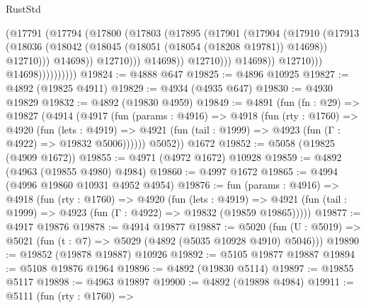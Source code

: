 \begin{lexlean}{RustStd}
\begin{coremodule}
                                      (@17791
                                        (@17794
                                          (@17800
                                            (@17803
                                              (@17895
                                                (@17901
                                                  (@17904
                                                    (@17910
                                                      (@17913
                                                        (@18036
                                                          (@18042
                                                            (@18045
                                                              (@18051
                                                                (@18054 (@18208 @19781))
                                                                @14698))
                                                            @12710)))
                                                      @14698))
                                                  @12710)))
                                            @14698))
                                        @12710)))
                                  @14698))
                              @12710)))
                        @14698))))))))))
@19824 := @4888 @647
@19825 := @4896 @10925
@19827 := @4892 (@19825 @4911)
@19829 := @4934 (@4935 @647)
@19830 := @4930 @19829
@19832 := @4892 (@19830 @4959)
@19849 := @4891
    (fun (fn : @29) =>
    @19827
      (@4914
        (@4917
          (fun (params : @4916) =>
          @4918
            (fun (rty : @1760) =>
            @4920
              (fun (lets : @4919) =>
              @4921 (fun (tail : @1999) => @4923 (fun (Γ : @4922) => @19832 @5006))))))
        @5052))
    @1672
@19852 := @5058 (@19825 (@4909 @1672))
@19855 := @4971 (@4972 @1672) @10928
@19859 := @4892 (@4963 (@19855 @4980) @4984)
@19860 := @4997 @1672
@19865 := @4994 (@4996 @19860 @10931 @4952 @4954)
@19876 := fun (params : @4916) =>
  @4918
    (fun (rty : @1760) =>
    @4920
      (fun (lets : @4919) =>
      @4921 (fun (tail : @1999) => @4923 (fun (Γ : @4922) => @19832 (@19859 @19865)))))
@19877 := @4917 @19876
@19878 := @4914 @19877
@19887 := @5020
    (fun (U : @5019) => @5021 (fun (t : @7) => @5029 (@4892 (@5035 @10928 @4910) @5046)))
@19890 := @19852 (@19878 @19887) @10926
@19892 := @5105 @19877 @19887
@19894 := @5108 @19876 @1964
@19896 := @4892 (@19830 @5114)
@19897 := @19855 @5117
@19898 := @4963 @19897
@19900 := @4892 (@19898 @4984)
@19911 := @5111
    (fun (rty : @1760) =>

\end{coremodule}
\end{lexlean}
